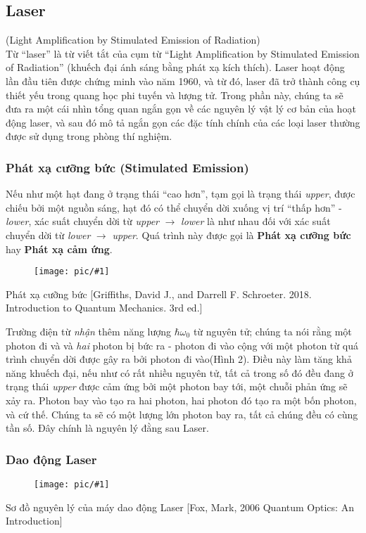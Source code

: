 \documentclass{report}
\newcommand{\image}[1]{
\begin{figure}[H]
	\centering
	\texttt{[image: pic/\#1]}
	\label{#1}
\end{figure}
}
\begin{document}
\subsection{Laser}(Light Amplification by
Stimulated Emission of Radiation) \\
Từ ``laser'' là từ viết tắt của cụm từ ``Light Amplification by Stimulated Emission of Radiation'' (khuếch đại ánh sáng bằng phát xạ kích thích). Laser hoạt động lần đầu tiên được chứng minh vào năm 1960, và từ đó, laser đã trở thành công cụ thiết yếu trong quang học phi tuyến và lượng tử. Trong phần này, chúng ta sẽ đưa ra một cái nhìn tổng quan ngắn gọn về các nguyên lý vật lý cơ bản của hoạt động laser, và sau đó mô tả ngắn gọn các đặc tính chính của các loại laser thường được sử dụng trong phòng thí nghiệm.
\subsubsection{Phát xạ cưỡng bức (Stimulated Emission)}
Nếu như một hạt đang ở trạng thái ``cao hơn'', tạm gọi là trạng thái \textit{upper}, được chiếu bởi một nguồn sáng, hạt đó có thể chuyển dời xuống vị trí ``thấp hơn'' - \textit{lower}, xác suất chuyển dời từ \textit{upper} $\rightarrow$ \textit{lower} là như nhau đối với xác suất chuyển dời từ \textit{lower} $\rightarrow$ \textit{upper}. Quá trình này được gọi là \textbf{Phát xạ cưỡng bức} hay \textbf{Phát xạ cảm ứng}.
\image{stimulatedemission.png}{Phát xạ cưỡng bức [Griffiths, David J., and Darrell F. Schroeter. 2018. Introduction to Quantum Mechanics. 3rd ed.]}

Trường điện từ \textit{nhận} thêm năng lượng $\hbar \omega_0$ từ nguyên tử; chúng ta nói rằng một photon đi và và \textit{hai} photon bị bức ra - photon đi vào cộng với một photon từ quá trình chuyển dời được gây ra bởi photon đi vào(Hình 2). Điều này làm tăng khả năng khuếch đại, nếu như có rất nhiều nguyên tử, tất cả trong số đó đều đang ở trạng thái \textit{upper} được cảm ứng bởi một photon bay tới, một chuỗi phản ứng sẽ xảy ra. Photon bay vào tạo ra hai photon, hai photon đó tạo ra một bốn photon, và cứ thế. Chúng ta sẽ có một lượng lớn photon bay ra, tất cả chúng đều có cùng tần số. Đây chính là nguyên lý đằng sau Laser.
\subsubsection{Dao động Laser}
\image{fig4.8.png}{Sơ đồ nguyên lý của máy dao động Laser [Fox, Mark, 2006 Quantum Optics: An Introduction]}
\end{document}
